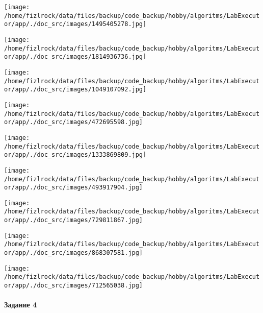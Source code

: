 \documentclass[a4paper, 12pt]{article}
\begin{document}
\texttt{[image: /home/fizlrock/data/files/backup/code\_backup/hobby/algoritms/LabExecutor/app/./doc\_src/images/1495405278.jpg]}

\texttt{[image: /home/fizlrock/data/files/backup/code\_backup/hobby/algoritms/LabExecutor/app/./doc\_src/images/1814936736.jpg]}

\texttt{[image: /home/fizlrock/data/files/backup/code\_backup/hobby/algoritms/LabExecutor/app/./doc\_src/images/1049107092.jpg]}

\texttt{[image: /home/fizlrock/data/files/backup/code\_backup/hobby/algoritms/LabExecutor/app/./doc\_src/images/472695598.jpg]}

\texttt{[image: /home/fizlrock/data/files/backup/code\_backup/hobby/algoritms/LabExecutor/app/./doc\_src/images/1333869809.jpg]}

\texttt{[image: /home/fizlrock/data/files/backup/code\_backup/hobby/algoritms/LabExecutor/app/./doc\_src/images/493917904.jpg]}

\texttt{[image: /home/fizlrock/data/files/backup/code\_backup/hobby/algoritms/LabExecutor/app/./doc\_src/images/729811867.jpg]}

\texttt{[image: /home/fizlrock/data/files/backup/code\_backup/hobby/algoritms/LabExecutor/app/./doc\_src/images/868307581.jpg]}

\texttt{[image: /home/fizlrock/data/files/backup/code\_backup/hobby/algoritms/LabExecutor/app/./doc\_src/images/712565038.jpg]}
\pagebreak
\paragraph{Задание 4}
\end{document}
